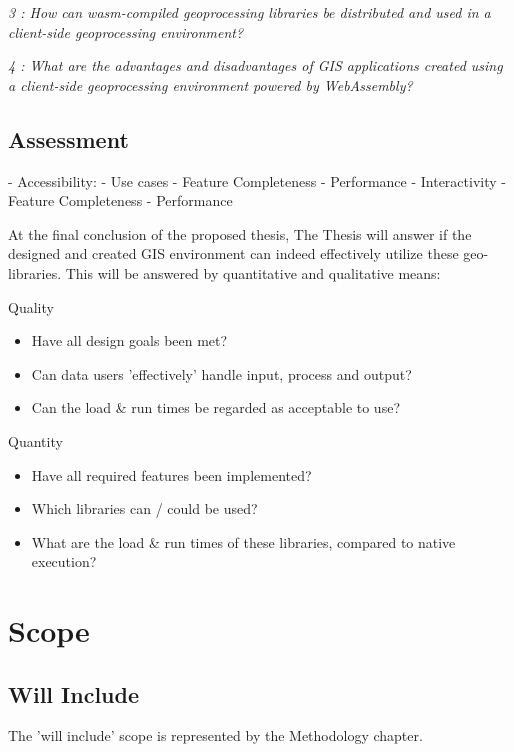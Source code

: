 \textit{3 : How can wasm-compiled geoprocessing libraries be distributed and used in a client-side geoprocessing environment?}

\textit{4 : What are the advantages and disadvantages of GIS applications created using a client-side geoprocessing environment powered by WebAssembly?}

\newpage
\subsection*{Assessment}

- Accessibility: 
  - Use cases
    - Feature Completeness 
    - Performance
- Interactivity 
  - Feature Completeness 
  - Performance


At the final conclusion of the proposed thesis, The Thesis will answer if the designed and created GIS environment can indeed effectively utilize these geo-libraries.
This will be answered by quantitative and qualitative means:

Quality
\begin{itemize}
    \item Have all design goals been met?
    \item Can data users 'effectively' handle input, process and output?
    \item Can the load \& run times be regarded as acceptable to use? 
\end{itemize} 

Quantity
\begin{itemize}
    \item Have all required features been implemented?
    \item Which libraries can / could be used?
    \item What are the load \& run times of these libraries, compared to native execution?
\end{itemize} 

\newpage
\section{Scope}
\subsection*{Will Include}

The 'will include' scope is represented by the Methodology chapter. 


